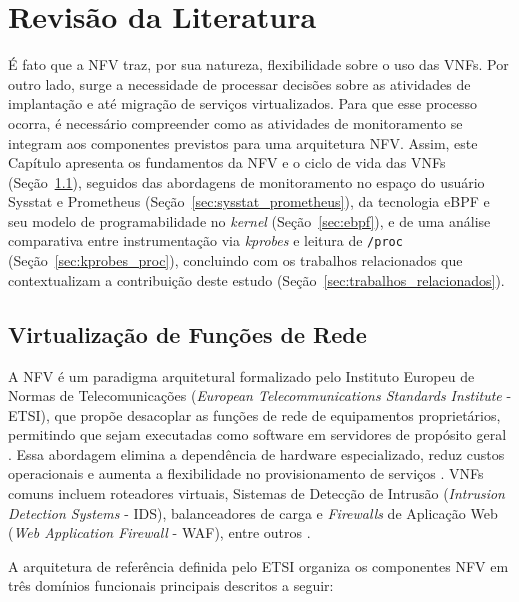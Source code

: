 \chapter{Revisão da Literatura}
\label{chap:revisao_literatura}

É fato que a NFV traz, por sua natureza, flexibilidade sobre o uso das VNFs. Por outro lado, surge a necessidade de processar decisões sobre as atividades de implantação e até migração de serviços virtualizados. Para que esse processo ocorra, é necessário compreender como as atividades de monitoramento se integram aos componentes previstos para uma arquitetura NFV. Assim, este Capítulo apresenta os fundamentos da NFV e o ciclo de vida das VNFs (Seção~\ref{sec:nfv}), seguidos das abordagens de monitoramento no espaço do usuário Sysstat e Prometheus (Seção~\ref{sec:sysstat_prometheus}), da tecnologia eBPF e seu modelo de programabilidade no \textit{kernel} (Seção~\ref{sec:ebpf}), e de uma análise comparativa entre instrumentação via \textit{kprobes} e leitura de \texttt{/proc} (Seção~\ref{sec:kprobes_proc}), concluindo com os trabalhos relacionados que contextualizam a contribuição deste estudo (Seção~\ref{sec:trabalhos_relacionados}).

\section{Virtualização de Funções de Rede}
\label{sec:nfv}

A NFV é um paradigma arquitetural formalizado pelo Instituto Europeu de Normas de Telecomunicações (\textit{European Telecommunications Standards Institute} - ETSI), que propõe desacoplar as funções de rede de equipamentos proprietários, permitindo que sejam executadas como software em servidores de propósito geral \cite{etsi_nfv_002_2014, etsi_nfv_006_2024, mijumbi2016}. Essa abordagem elimina a dependência de hardware especializado, reduz custos operacionais e aumenta a flexibilidade no provisionamento de serviços \cite{7045396, 10.1145/3397022}. VNFs comuns incluem roteadores virtuais, Sistemas de Detecção de Intrusão (\textit{Intrusion Detection Systems} - IDS), balanceadores de carga e \textit{Firewalls} de Aplicação Web (\textit{Web Application Firewall} - WAF), entre outros \cite{10.1145/3172866}.

A arquitetura de referência definida pelo ETSI organiza os componentes NFV em três domínios funcionais principais \cite{etsi_nfv_002_2014, etsi_nfv_006_2024, mijumbi2016, repec:wly:intnem:v:31:y:2021:i:5:n:e2068} descritos a seguir:

